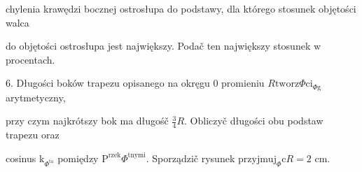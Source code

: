 \documentclass[a4paper,12pt]{article}
\begin{document}
chylenia krawędzi bocznej ostrosłupa do podstawy, dla którego stosunek objętości walca

do objętości ostrosłupa jest największy. Podač ten największy stosunek $\mathrm{w}$ procentach.

6. Długości boków trapezu opisanego na okręgu $0$ promieniu $R\mathrm{t}\mathrm{w}\mathrm{o}\mathrm{r}\mathrm{z}\Phi \mathrm{c}\mathrm{i}_{\Phi \mathrm{g}}$ arytmetyczny,

przy czym najkrótszy bok ma długośč $\displaystyle \frac{3}{4}R$. Obliczyč długości obu podstaw trapezu oraz

cosinus $\mathrm{k}_{\Phi^{\mathrm{t}\mathrm{a}}}$ pomiędzy $\mathrm{P}^{\mathrm{r}\mathrm{z}\mathrm{e}\mathrm{k}}\Phi^{\mathrm{t}\mathrm{n}\mathrm{y}\mathrm{m}\mathrm{i}}$. Sporządzič rysunek $\mathrm{p}\mathrm{r}\mathrm{z}\mathrm{y}\mathrm{j}\mathrm{m}\mathrm{u}\mathrm{j}_{\Phi}\mathrm{c}R=2$ cm.
\end{document}
